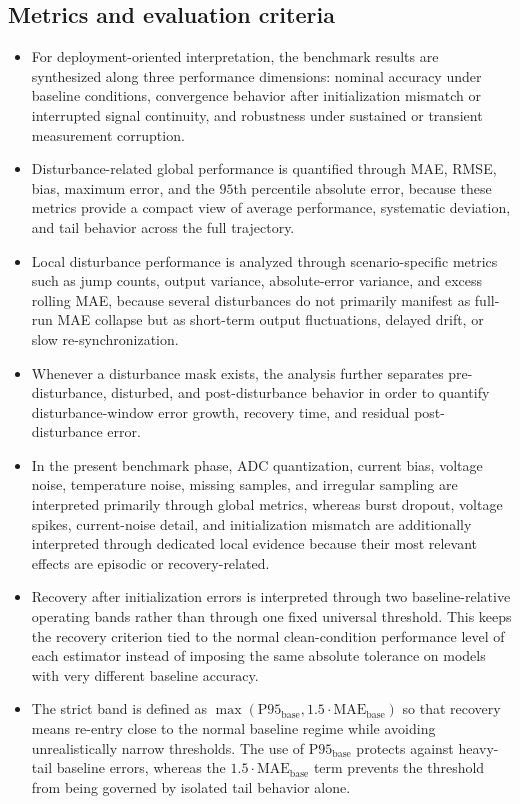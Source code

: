 \documentclass[review]{elsarticle}
\begin{document}
\subsection{Metrics and evaluation criteria}
\begin{itemize}[leftmargin=*]
    \item For deployment-oriented interpretation, the benchmark results are synthesized along three performance dimensions: nominal accuracy under baseline conditions, convergence behavior after initialization mismatch or interrupted signal continuity, and robustness under sustained or transient measurement corruption.
    \item Disturbance-related global performance is quantified through MAE, RMSE, bias, maximum error, and the $95$th percentile absolute error, because these metrics provide a compact view of average performance, systematic deviation, and tail behavior across the full trajectory.
    \item Local disturbance performance is analyzed through scenario-specific metrics such as jump counts, output variance, absolute-error variance, and excess rolling MAE, because several disturbances do not primarily manifest as full-run MAE collapse but as short-term output fluctuations, delayed drift, or slow re-synchronization.
    \item Whenever a disturbance mask exists, the analysis further separates pre-disturbance, disturbed, and post-disturbance behavior in order to quantify disturbance-window error growth, recovery time, and residual post-disturbance error.
    \item In the present benchmark phase, ADC quantization, current bias, voltage noise, temperature noise, missing samples, and irregular sampling are interpreted primarily through global metrics, whereas burst dropout, voltage spikes, current-noise detail, and initialization mismatch are additionally interpreted through dedicated local evidence because their most relevant effects are episodic or recovery-related.
    \item Recovery after initialization errors is interpreted through two baseline-relative operating bands rather than through one fixed universal threshold. This keeps the recovery criterion tied to the normal clean-condition performance level of each estimator instead of imposing the same absolute tolerance on models with very different baseline accuracy.
    \item The strict band is defined as $\max(\mathrm{P95}_{\mathrm{base}},1.5 \cdot \mathrm{MAE}_{\mathrm{base}})$ so that recovery means re-entry close to the normal baseline regime while avoiding unrealistically narrow thresholds. The use of $\mathrm{P95}_{\mathrm{base}}$ protects against heavy-tail baseline errors, whereas the $1.5 \cdot \mathrm{MAE}_{\mathrm{base}}$ term prevents the threshold from being governed by isolated tail behavior alone.

\end{itemize}
\end{document}
